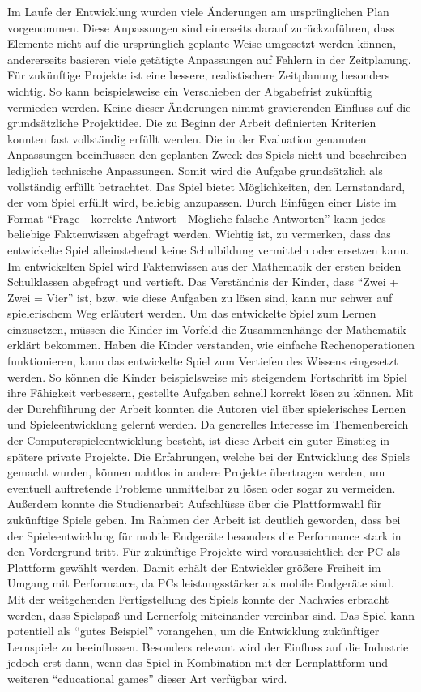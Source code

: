 Im Laufe der Entwicklung wurden viele Änderungen am ursprünglichen Plan vorgenommen. Diese Anpassungen sind einerseits darauf zurückzuführen, dass Elemente nicht auf die ursprünglich geplante Weise umgesetzt werden können, andererseits basieren viele getätigte Anpassungen auf Fehlern in der Zeitplanung. Für zukünftige Projekte ist eine bessere, realistischere Zeitplanung besonders wichtig. So kann beispielsweise ein Verschieben der Abgabefrist zukünftig vermieden werden.
Keine dieser Änderungen nimmt gravierenden Einfluss auf die grundsätzliche Projektidee. Die zu Beginn der Arbeit definierten Kriterien konnten fast vollständig erfüllt werden. Die in der Evaluation genannten Anpassungen beeinflussen den geplanten Zweck des Spiels nicht und beschreiben lediglich technische Anpassungen. Somit wird die Aufgabe grundsätzlich als vollständig erfüllt betrachtet.
Das Spiel bietet Möglichkeiten, den Lernstandard, der vom Spiel erfüllt wird, beliebig anzupassen. Durch Einfügen einer Liste im Format \enquote{Frage - korrekte Antwort - Mögliche falsche Antworten} kann jedes beliebige Faktenwissen abgefragt werden.
Wichtig ist, zu vermerken, dass das entwickelte Spiel alleinstehend keine Schulbildung vermitteln oder ersetzen kann. Im entwickelten Spiel wird Faktenwissen aus der Mathematik der ersten beiden Schulklassen abgefragt und vertieft. Das Verständnis der Kinder, dass \enquote{Zwei + Zwei = Vier} ist, bzw. wie diese Aufgaben zu lösen sind, kann nur schwer auf spielerischem Weg erläutert werden. Um das entwickelte Spiel zum Lernen einzusetzen, müssen die Kinder im Vorfeld die Zusammenhänge der Mathematik erklärt bekommen. Haben die Kinder verstanden, wie einfache Rechenoperationen funktionieren, kann das entwickelte Spiel zum Vertiefen des Wissens eingesetzt werden. So können die Kinder beispielsweise mit steigendem Fortschritt im Spiel ihre Fähigkeit verbessern, gestellte Aufgaben schnell korrekt lösen zu können.
Mit der Durchführung der Arbeit konnten die Autoren viel über spielerisches Lernen und Spieleentwicklung gelernt werden. Da generelles Interesse im Themenbereich der Computerspieleentwicklung besteht, ist diese Arbeit ein guter Einstieg in spätere private Projekte. Die Erfahrungen, welche bei der Entwicklung des Spiels gemacht wurden, können nahtlos in andere Projekte übertragen werden, um eventuell auftretende Probleme unmittelbar zu lösen oder sogar zu vermeiden. Außerdem konnte die Studienarbeit Aufschlüsse über die Plattformwahl für zukünftige Spiele geben. Im Rahmen der Arbeit ist deutlich geworden, dass bei der Spieleentwicklung für mobile Endgeräte besonders die Performance stark in den Vordergrund tritt. Für zukünftige Projekte wird voraussichtlich der PC als Plattform gewählt werden. Damit erhält der Entwickler größere Freiheit im Umgang mit Performance, da PCs leistungsstärker als mobile Endgeräte sind.
Mit der weitgehenden Fertigstellung des Spiels konnte der Nachwies erbracht werden, dass Spielspaß und Lernerfolg miteinander vereinbar sind. Das Spiel kann potentiell als \enquote{gutes Beispiel} vorangehen, um die Entwicklung zukünftiger Lernspiele zu beeinflussen. Besonders relevant wird der Einfluss auf die Industrie jedoch erst dann, wenn das Spiel in Kombination mit der Lernplattform und weiteren \enquote{educational games} dieser Art verfügbar wird.


